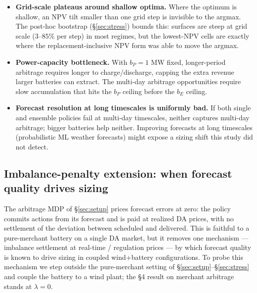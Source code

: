 \documentclass[11pt]{article}
\begin{document}
\begin{itemize}
\item \textbf{Grid-scale plateaus around shallow optima.} Where the optimum is shallow, an NPV tilt smaller than one grid step is invisible to the argmax. The post-hoc bootstrap (\S\ref{sec:stress}) bounds this: surfaces are steep at grid scale ($3$--$85\%$ per step) in most regimes, but the lowest-NPV cells are exactly where the replacement-inclusive NPV form was able to move the argmax.
\item \textbf{Power-capacity bottleneck.} With $b_P = 1$ MW fixed, longer-period arbitrage requires longer to charge/discharge, capping the extra revenue larger batteries can extract. The multi-day arbitrage opportunities require slow accumulation that hits the $b_P$ ceiling before the $b_E$ ceiling.
\item \textbf{Forecast resolution at long timescales is uniformly bad.} If both single and ensemble policies fail at multi-day timescales, neither captures multi-day arbitrage; bigger batteries help neither. Improving forecasts at long timescales (probabilistic ML weather forecasts) might expose a sizing shift this study did not detect.
\end{itemize}

\subsection{Imbalance-penalty extension: when forecast quality drives sizing}\label{sec:imbalance}

The arbitrage MDP of \S\ref{sec:setup} prices forecast errors at zero: the policy commits actions from its forecast and is paid at realized DA prices, with no settlement of the deviation between scheduled and delivered. This is faithful to a pure-merchant battery on a single DA market, but it removes one mechanism --- imbalance settlement at real-time / regulation prices --- by which forecast quality is known to drive sizing in coupled wind+battery configurations. To probe this mechanism we step outside the pure-merchant setting of \S\ref{sec:setup}--\S\ref{sec:stress} and couple the battery to a wind plant; the §4 result on merchant arbitrage stands at $\lambda = 0$.
\end{document}
